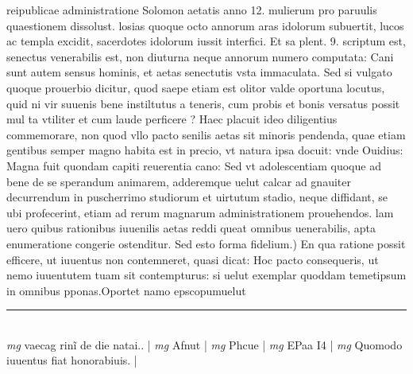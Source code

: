\documentclass{article}
\begin{document}
\begin{pages}
reipublicae administratione Solomon aetatis anno 12. mulierum pro paruulis quaestionem dissolust. losias quoque octo annorum aras idolorum subuertit, lucos ac templa excidit, sacerdotes idolorum iussit interfici. Et sa plent. 9. scriptum est, senectus venerabilis est, non diuturna neque annorum numero computata: Cani sunt autem sensus hominis, et aetas senectutis vsta immaculata. Sed  si vulgato quoque prouerbio dicitur, quod saepe etiam est olitor valde oportuna locutus, quid ni vir suuenis bene instiltutus a teneris, cum probis et bonis versatus possit mul ta vtiliter et cum laude perficere ? Haec placuit ideo diligentius commemorare, non quod vllo pacto senilis aetas sit minoris pendenda, quae etiam gentibus semper magno habita est in precio, vt natura ipsa docuit: vnde Ouidius: Magna fuit quondam capiti reuerentia cano: Sed vt adolescentiam quoque ad bene de se sperandum animarem, adderemque  uelut calcar ad gnauiter decurrendum in puscherrimo studiorum et uirtutum stadio, neque  diffidant, se ubi profecerint, etiam ad rerum magnarum administrationem prouehendos. lam uero quibus rationibus iuuenilis aetas reddi queat omnibus uenerabilis, apta enumeratione congerie ostenditur.  \pend\pstart Sed esto forma fidelium.) En qua ratione possit efficere, ut iuuentus non contemneret, quasi dicat: Hoc pacto consequeris, ut nemo iuuentutem tuam sit contempturus: si uelut exemplar quoddam temetipsum in omnibus pponas.Oportet namo epscopumuelut  \pend
\vspace{0.5cm}\noindent
\vspace{0.2cm}\rule{1cm}{0.2pt}\\ 
\hspace{0.2cm}\textit{mg}
\footnotesize vaecag rinĩ de die natai.. 
\normalsize| 
\hspace{0.2cm}\textit{mg}
\footnotesize Afnut 
\normalsize| 
\hspace{0.2cm}\textit{mg}
\footnotesize Phcue 
\normalsize| 
\hspace{0.2cm}\textit{mg}
\footnotesize EPaa I4 
\normalsize| 
\hspace{0.2cm}\textit{mg}
\footnotesize Quomodo iuuentus fiat honorabiuis. 
\normalsize| 

\end{pages}
\end{document}
